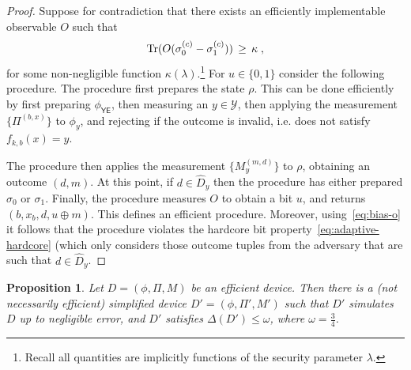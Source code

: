 \documentclass[11pt]{article}
\newtheorem{proposition}[theorem]{Proposition}
\theoremstyle{remark}
\theoremstyle{definition}
\newcommand{\Tr}{\mbox{\rm Tr}}
\newcommand{\reg}[1]{{\textsf{#1}}}
\newcommand{\mY}{\ensuremath{\mathcal{Y}}}
\begin{document}
\begin{proof}
Suppose for contradiction that there exists an efficiently implementable observable $O$ such that 
\begin{equation}\label{eq:bias-o}
\Tr(O(\sigma_0^{(c)}-\sigma_1^{(c)})) \,\geq\, \kappa\;,
\end{equation}
 for some non-negligible function $\kappa(\lambda)$.\footnote{Recall all quantities are implicitly functions of the security parameter $\lambda$.} For $u\in\{0,1\}$ consider the following procedure. The procedure first prepares the state $\rho$. This can be done efficiently by first preparing $\phi_{\reg{YE}}$, then measuring an $y\in \mY$, then applying the measurement $\{\Pi^{(b,x)}\}$ to $\phi_y$, and rejecting if the outcome is invalid, i.e. does not satisfy $f_{k,b}(x)=y$. 

The procedure then applies the measurement $\{M_y^{(m,d)}\}$ to $\rho$, obtaining an outcome $(d,m)$. At this point, if $d\in \hat{D}_{y}$ then the procedure has either prepared $\sigma_0$ or $\sigma_1$. Finally, the procedure  measures $O$ to obtain a bit $u$, and returns $(b,x_b,d,u\oplus m)$. This defines an efficient procedure. Moreover, using~\eqref{eq:bias-o} it follows  that the procedure violates the hardcore bit property~\eqref{eq:adaptive-hardcore} (which only considers those outcome tuples from the adversary that are such that $d\in\hat{D}_{y}$. 
\end{proof}


\begin{proposition}\label{prop:change-d}
Let $D=(\phi,\Pi,M)$ be an efficient device. Then there is a (not necessarily efficient) simplified device $D'=(\phi,\Pi',M')$ such that $D'$ simulates $D$ up to negligible error, and $D'$ satisfies $\Delta(D') \leq \omega$, where $\omega = \frac{3}{4}$.
\end{proposition}
\end{document}
